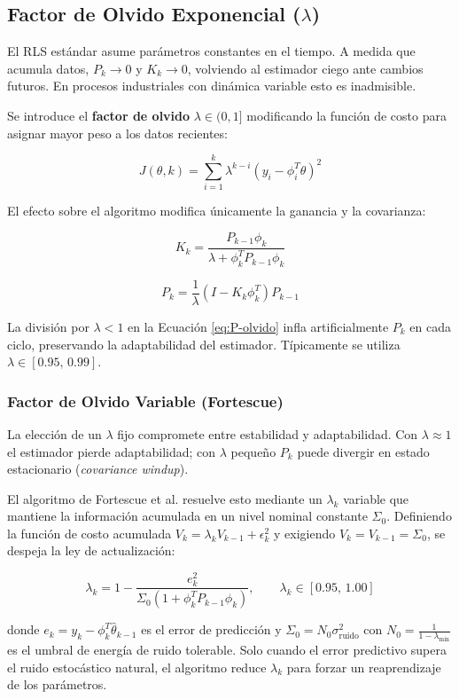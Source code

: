 \subsection{Factor de Olvido Exponencial ($\lambda$)}

El RLS estándar asume parámetros constantes en el tiempo. A medida que acumula datos, $P_k \to 0$ y $K_k \to 0$, volviendo al estimador ciego ante cambios futuros. En procesos industriales con dinámica variable esto es inadmisible.

Se introduce el \textbf{factor de olvido} $\lambda \in (0,1]$ modificando la función de costo para asignar mayor peso a los datos recientes:

\[
  J(\theta,k) = \sum_{i=1}^{k} \lambda^{k-i}(y_i - \phi_i^T\theta)^2
\]

El efecto sobre el algoritmo modifica únicamente la ganancia y la covarianza:

\begin{equation}
  K_k = \frac{P_{k-1}\phi_k}{\lambda + \phi_k^T P_{k-1}\phi_k}
  \label{eq:K-olvido}
\end{equation}

\begin{equation}
  P_k = \frac{1}{\lambda}(I - K_k\phi_k^T)P_{k-1}
  \label{eq:P-olvido}
\end{equation}

La división por $\lambda < 1$ en la Ecuación \ref{eq:P-olvido} infla artificialmente $P_k$ en cada ciclo, preservando la adaptabilidad del estimador. Típicamente se utiliza $\lambda \in [0.95,\, 0.99]$.

\subsubsection{Factor de Olvido Variable (Fortescue)}

La elección de un $\lambda$ fijo compromete entre estabilidad y adaptabilidad. Con $\lambda \approx 1$ el estimador pierde adaptabilidad; con $\lambda$ pequeño $P_k$ puede divergir en estado estacionario (\textit{covariance windup}).

El algoritmo de Fortescue et al. resuelve esto mediante un $\lambda_k$ variable que mantiene la información acumulada en un nivel nominal constante $\Sigma_0$. Definiendo la función de costo acumulada $V_k = \lambda_k V_{k-1} + \epsilon_k^2$ y exigiendo $V_k = V_{k-1} = \Sigma_0$, se despeja la ley de actualización:

\begin{equation}
  \lambda_k = 1 - \frac{e_k^2}{\Sigma_0(1 + \phi_k^T P_{k-1}\phi_k)}, \qquad \lambda_k \in [0.95,\, 1.00]
\end{equation}

donde $e_k = y_k - \phi_k^T\hat{\theta}_{k-1}$ es el error de predicción y $\Sigma_0 = N_0\sigma_{\text{ruido}}^2$ con $N_0 = \frac{1}{1-\lambda_{\min}}$ es el umbral de energía de ruido tolerable. Solo cuando el error predictivo supera el ruido estocástico natural, el algoritmo reduce $\lambda_k$ para forzar un reaprendizaje de los parámetros.
